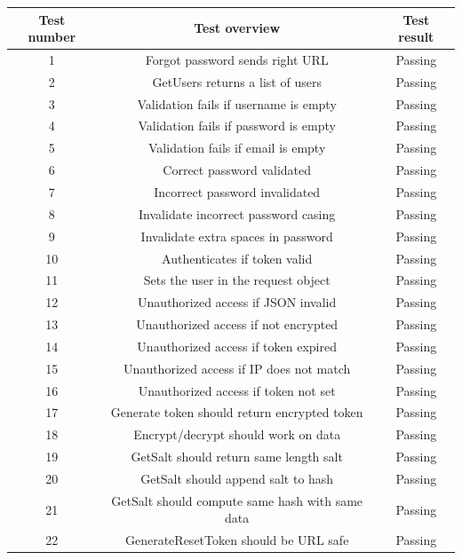 \documentclass[a4paper,12pt]{article}
\begin{document}
   			\begin{tabular}{ |c|c|c| } 
    			\hline
    			Test number & Test overview & Test result \\
    			\hline
    			1 & Forgot password sends right URL & Passing\\
    			\hline
    			2 & GetUsers returns a list of users & Passing\\
    			\hline
    			3 & Validation fails if username is empty & Passing\\
    			\hline
    			4 & Validation fails if password is empty & Passing\\
    			\hline
    			5 & Validation fails if email is empty & Passing\\
    			\hline
    			6 & Correct password validated & Passing\\
    			\hline
    			7 & Incorrect password invalidated & Passing\\
    			\hline
    			8 & Invalidate incorrect password casing & Passing\\
    			\hline
    			9 & Invalidate extra spaces in password & Passing\\
    			\hline
    			10 & Authenticates if token valid & Passing\\
    			\hline
    			11 & Sets the user in the request object & Passing\\
    			\hline
    			12 & Unauthorized access if JSON invalid & Passing\\
    			\hline
    			13 & Unauthorized access if not encrypted & Passing\\
    			\hline
    			14 & Unauthorized access if token expired & Passing\\
    			\hline
    			15 & Unauthorized access if IP does not match & Passing\\
    			\hline
    			16 & Unauthorized access if token not set & Passing\\
    			\hline
    			17 & Generate token should return encrypted token & Passing\\
    			\hline
    			18 & Encrypt/decrypt should work on data & Passing\\
    			\hline
    			19 & GetSalt should return same length salt & Passing\\
    			\hline
    			20 & GetSalt should append salt to hash & Passing\\
    			\hline
    			21 & GetSalt should compute same hash with same data & Passing\\
    			\hline
    			22 & GenerateResetToken should be URL safe & Passing\\

\end{tabular}
\end{document}
